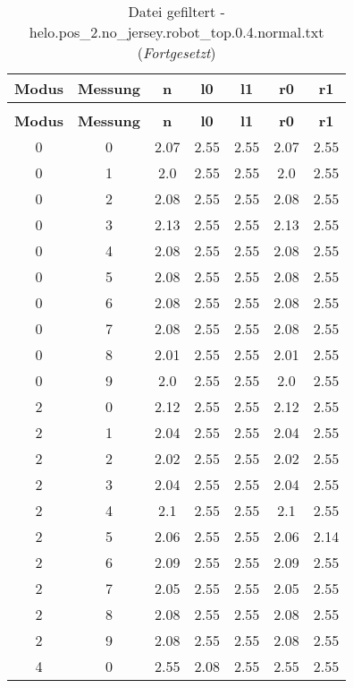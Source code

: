 \begin{longtable}{|c|c||c||c|c||c|c|}
	\caption{Datei gefiltert - helo.pos\_2.no\_jersey.robot\_top.0.4.normal.txt} \label{tab:helo.pos-2.no-jersey.robot-top.0.4.normal.txt} \\ \hline
	\textbf{Modus} & \textbf{Messung} & \textbf{n} & \textbf{l0} & \textbf{l1} & \textbf{r0} & \textbf{r1}\\ \hline
	\endfirsthead
	\caption[]{Datei gefiltert - helo.pos\_2.no\_jersey.robot\_top.0.4.normal.txt (\emph{Fortgesetzt})} \\ \hline
	\textbf{Modus} & \textbf{Messung} & \textbf{n} & \textbf{l0} & \textbf{l1} & \textbf{r0} & \textbf{r1}\\ \hline
	\endhead
	0 & 0 & 2.07 & 2.55 & 2.55 & 2.07 & 2.55 \\ \hline
	0 & 1 & 2.0 & 2.55 & 2.55 & 2.0 & 2.55 \\ \hline
	0 & 2 & 2.08 & 2.55 & 2.55 & 2.08 & 2.55 \\ \hline
	0 & 3 & 2.13 & 2.55 & 2.55 & 2.13 & 2.55 \\ \hline
	0 & 4 & 2.08 & 2.55 & 2.55 & 2.08 & 2.55 \\ \hline
	0 & 5 & 2.08 & 2.55 & 2.55 & 2.08 & 2.55 \\ \hline
	0 & 6 & 2.08 & 2.55 & 2.55 & 2.08 & 2.55 \\ \hline
	0 & 7 & 2.08 & 2.55 & 2.55 & 2.08 & 2.55 \\ \hline
	0 & 8 & 2.01 & 2.55 & 2.55 & 2.01 & 2.55 \\ \hline
	0 & 9 & 2.0 & 2.55 & 2.55 & 2.0 & 2.55 \\ \hline
	2 & 0 & 2.12 & 2.55 & 2.55 & 2.12 & 2.55 \\ \hline
	2 & 1 & 2.04 & 2.55 & 2.55 & 2.04 & 2.55 \\ \hline
	2 & 2 & 2.02 & 2.55 & 2.55 & 2.02 & 2.55 \\ \hline
	2 & 3 & 2.04 & 2.55 & 2.55 & 2.04 & 2.55 \\ \hline
	2 & 4 & 2.1 & 2.55 & 2.55 & 2.1 & 2.55 \\ \hline
	2 & 5 & 2.06 & 2.55 & 2.55 & 2.06 & 2.14 \\ \hline
	2 & 6 & 2.09 & 2.55 & 2.55 & 2.09 & 2.55 \\ \hline
	2 & 7 & 2.05 & 2.55 & 2.55 & 2.05 & 2.55 \\ \hline
	2 & 8 & 2.08 & 2.55 & 2.55 & 2.08 & 2.55 \\ \hline
	2 & 9 & 2.08 & 2.55 & 2.55 & 2.08 & 2.55 \\ \hline
	4 & 0 & 2.55 & 2.08 & 2.55 & 2.55 & 2.55 \\ \hline

\end{longtable}
